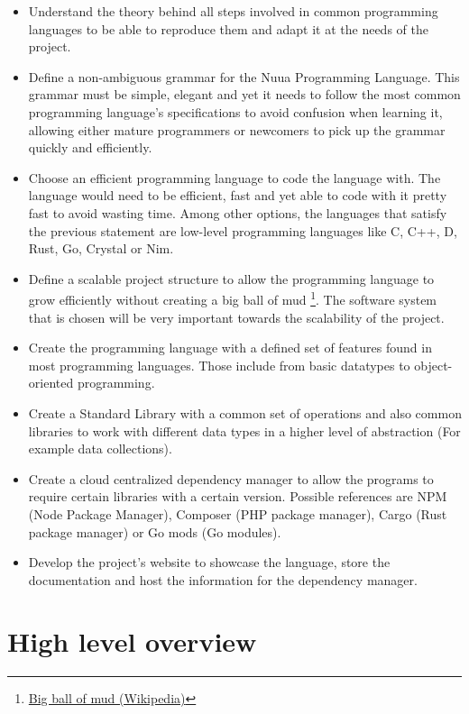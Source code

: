 \begin{itemize}
    \item Understand the theory behind all steps involved in common programming languages to be able to reproduce them and adapt it
        at the needs of the project.
    \item Define a non-ambiguous grammar for the Nuua Programming Language. This grammar must be simple, elegant and yet it needs to follow the most
        common programming language's specifications to avoid confusion when learning it, allowing either mature programmers or newcomers to pick up the grammar quickly and efficiently.
    \item Choose an efficient programming language to code the language with. The language would need to be efficient, fast and yet able to code with it
        pretty fast to avoid wasting time. Among other options, the languages that satisfy the previous statement are low-level programming languages like
        C, C++, D, Rust, Go, Crystal or Nim.
    \item Define a scalable project structure to allow the programming language to grow efficiently without creating a
        big ball of mud \footnote{\href{https://en.wikipedia.org/wiki/Big_ball_of_mud}{Big ball of mud (Wikipedia)}}. The software system that is chosen will be very important towards the scalability of the project.
    \item Create the programming language with a defined set of features found in most programming languages. Those include from basic datatypes
        to object-oriented programming.
    \item Create a Standard Library with a common set of operations and also common libraries to work with different data types in
        a higher level of abstraction (For example data collections).
    \item Create a cloud centralized dependency manager to allow the programs to require certain libraries with a certain version. Possible
        references are NPM (Node Package Manager), Composer (PHP package manager), Cargo (Rust package manager) or Go mods (Go modules).
    \item Develop the project's website to showcase the language, store the documentation and host the information for the dependency manager.
\end{itemize}

\section{High level overview}

